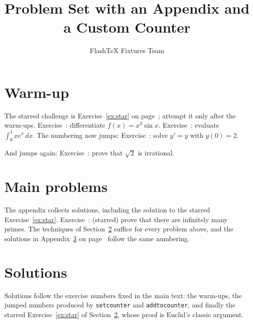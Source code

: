 \documentclass[11pt]{article}
\title{Problem Set with an Appendix and a Custom Counter}
\author{FlashTeX Fixtures Team}
\date{}
\newcounter{exercise}
\begin{document}
\maketitle
\tableofcontents
\section{Warm-up}
The starred challenge is Exercise~\ref{ex:star} on page~\pageref{ex:star}; attempt it only after the warm-ups. Exercise~\theexercise: differentiate $f(x) = x^3 \sin x$. Exercise~\theexercise: evaluate $\int_0^1 x e^x \, dx$. \setcounter{exercise}{10} The numbering now jumps: Exercise~\theexercise: solve $y' = y$ with $y(0) = 2$. \addtocounter{exercise}{4} And jumps again: Exercise~\theexercise: prove that $\sqrt{2}$ is irrational.
\section{Main problems}
\label{sec:main}
The appendix collects solutions, including the solution to the starred Exercise~\ref{ex:star}. \label{ex:star}Exercise~\theexercise: (starred) prove that there are infinitely many primes. The techniques of Section~\ref{sec:main} suffice for every problem above, and the solutions in Appendix~\ref{app:sol} on page~\pageref{app:sol} follow the same numbering.
\appendix
\section{Solutions}
\label{app:sol}
Solutions follow the exercise numbers fixed in the main text: the warm-ups, the jumped numbers produced by \texttt{setcounter} and \texttt{addtocounter}, and finally the starred Exercise~\ref{ex:star} of Section~\ref{sec:main}, whose proof is Euclid's classic argument.
\end{document}

